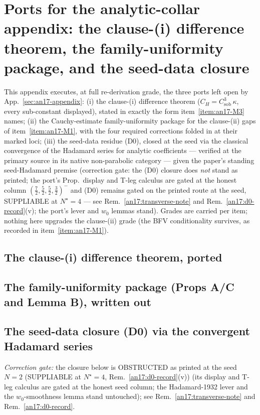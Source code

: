 
\renewcommand{\thesection}{E2aP}%
\section{Ports for the analytic-collar appendix: the clause-(i)
  difference theorem, the family-uniformity package, and the seed-data
  closure}
\label{app:e2a-ports}

This appendix executes, at full re-derivation grade, the three ports
left open by App.~\ref{sec:an17-appendix}: (i) the clause-(i) difference theorem
($C_H=C_{\mathrm{sob}}^{3}\,\kappa$, every sub-constant displayed),
stated in exactly the form item~\ref{item:an17-M3} names; (ii) the
Cauchy-estimate family-uniformity package for the clause-(ii) gaps of
item~\ref{item:an17-M1}, with the four required corrections folded
in at their marked loci; (iii) the seed-data residue (D0), closed at
the seed via the classical convergence of the Hadamard series for
analytic coefficients --- verified at the primary source in its native
non-parabolic category --- given the paper's standing seed-Hadamard
premise (correction gate: the (D0) closure does \emph{not} stand as printed;
the port's Prop.\ display and T-leg calculus are gated at the honest column
$(\tfrac72,\tfrac52,\tfrac52,\tfrac32)^-$ and (D0) remains gated on the printed route at the seed, SUPPLIABLE at
$N^\star{=}4$ --- see Rem.~\ref{an17:transverse-note} and
Rem.~\ref{an17:d0-record}(v); the port's
lever and $w_0$ lemmas stand). Grades are carried per item; nothing here
upgrades the clause-(ii) grade (the BFV conditionality survives, as recorded
in item~\ref{item:an17-M1}).

\subsection{The clause-(i) difference theorem, ported}


\subsection{The family-uniformity package (Props A/C and Lemma B),
  written out}


\subsection{The seed-data closure (D0) via the convergent Hadamard
  series}
\emph{Correction gate:} the closure below is OBSTRUCTED as printed at the seed $N{=}2$ (SUPPLIABLE
at $N^\star{=}4$, Rem.~\ref{an17:d0-record}(v)) (its display
and T-leg calculus are gated at the honest seed column; the Hadamard-1932
lever and the $w_0$-smoothness lemma stand untouched); see
Rem.~\ref{an17:transverse-note} and Rem.~\ref{an17:d0-record}.

